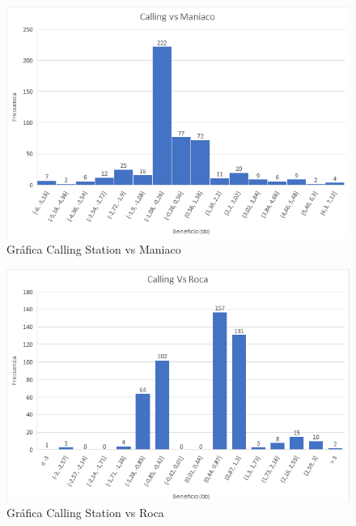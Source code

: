 \begin{figure}[h]
\centering
\includegraphics[width=1\textwidth]{figuras/CvM.png}   
\caption{Gráfica Calling Station vs Maniaco}
\label{fig:CvM}
\end{figure}

\begin{figure}[h]
\centering
\includegraphics[width=1\textwidth]{figuras/CvR.png}   
\caption{Gráfica Calling Station vs Roca}
\label{fig:CvR}
\end{figure}

